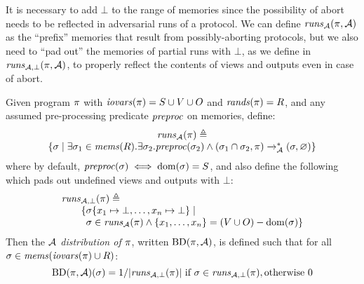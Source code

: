 It is necessary to add $\bot$ to the range of memories since
the possibility of abort needs to be reflected in adversarial
runs of a protocol. We can define $\mathit{runs}_{\mathcal{A}}(\pi,\mathcal{A})$
as the ``prefix'' memories that result from possibly-aborting
protocols, but we also need to ``pad out'' the memories
of partial runs with $\bot$, as we define in $\mathit{runs}_{\mathcal{A},\bot}(\pi,\mathcal{A})$,
to properly reflect the contents of views and outputs even in case of abort. 
\begin{definition}
  \label{def-aprogd}
  \label{def-aprogtt}
  \label{definition-aprogd}
  Given program $\pi$ with $\mathit{iovars}(\pi) = S \cup V \cup O$ and $\mathit{rands}(\pi) = R$, and
  any assumed pre-processing predicate $\mathit{preproc}$ on memories, define:
  $$
  \begin{array}{c}
    \mathit{runs}_{\mathcal{A}}(\pi) \triangleq \\
    \{ \sigma \mid \exists \sigma_1 \in \mathit{mems}(R) . 
    \exists \sigma_2 . \mathit{preproc}(\sigma_2) \wedge
    (\sigma_1 \cap \sigma_2,\pi) \xrightarrow{}^{*}_{\mathcal{A}} (\sigma,\varnothing) \}
  \end{array}
  $$
  where by default, $\mathit{preproc}(\sigma) \iff \mathrm{dom}(\sigma) = S$, and also define the following
  which pads out undefined views and outputs with $\bot$:
  $$
  \begin{array}{l}
    \botruns(\prog) \defeq \\
    \qquad \{ \store\{ x_1 \mapsto \bot, \ldots, x_n \mapsto \bot \} \mid \\
    \qquad \phantom{\{} \store \in \aruns(\prog) \wedge \{ x_1,\ldots,x_n\} = (V \cup O) - \dom(\store) \}
  \end{array}
  $$
  Then the \emph{$\mathcal{A}$ distribution of $\pi$}, written $\mathrm{BD}(\pi,\mathcal{A})$, is
  defined such that for all $\sigma \in \mathit{mems}(\mathit{iovars}(\pi) \cup R)$:
  $$
  \mathrm{BD}(\pi,\mathcal{A})(\sigma) =  1 / |\mathit{runs}_{\mathcal{A},\bot}(\pi)| \ \text{if}\ \sigma \in \mathit{runs}_{\mathcal{A},\bot}(\pi), \text{otherwise}\ 0
  $$
\end{definition}

